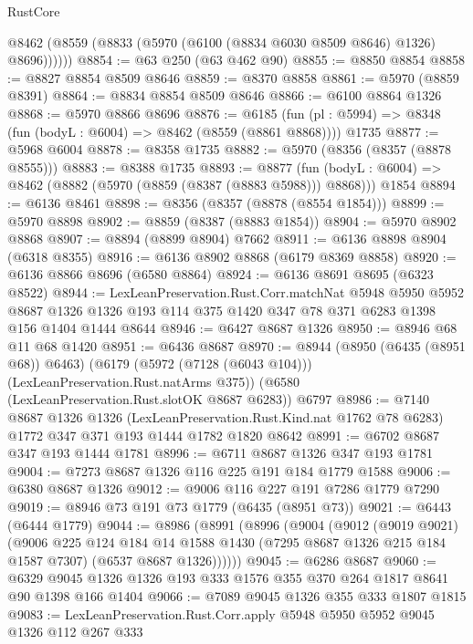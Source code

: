 \begin{lexlean}{RustCore}
\begin{coremodule}
{\begin{coremodule}
{{{{{{{{{{{{{{{{{{{{{{{{{{{{{{{{{{{{{{{{{{{{{        @8462 (@8559 (@8833 (@5970 (@6100 (@8834 @6030 @8509 @8646) @1326) @8696))))))
@8854 := @63 @250 (@63 @462 @90)
@8855 := @8850 @8854
@8858 := @8827 @8854 @8509 @8646
@8859 := @8370 @8858
@8861 := @5970 (@8859 @8391)
@8864 := @8834 @8854 @8509 @8646
@8866 := @6100 @8864 @1326
@8868 := @5970 @8866 @8696
@8876 := @6185
    (fun (pl : @5994) => @8348 (fun (bodyL : @6004) => @8462 (@8559 (@8861 @8868))))
    @1735
@8877 := @5968 @6004
@8878 := @8358 @1735
@8882 := @5970 (@8356 (@8357 (@8878 @8555)))
@8883 := @8388 @1735
@8893 := @8877
    (fun (bodyL : @6004) => @8462 (@8882 (@5970 (@8859 (@8387 (@8883 @5988))) @8868)))
    @1854
@8894 := @6136 @8461
@8898 := @8356 (@8357 (@8878 (@8554 @1854)))
@8899 := @5970 @8898
@8902 := @8859 (@8387 (@8883 @1854))
@8904 := @5970 @8902 @8868
@8907 := @8894 (@8899 @8904) @7662
@8911 := @6136 @8898 @8904 (@6318 @8355)
@8916 := @6136 @8902 @8868 (@6179 @8369 @8858)
@8920 := @6136 @8866 @8696 (@6580 @8864)
@8924 := @6136 @8691 @8695 (@6323 @8522)
@8944 := LexLeanPreservation.Rust.Corr.matchNat
    @5948
    @5950
    @5952
    @8687
    @1326
    @1326
    @193
    @114
    @375
    @1420
    @347
    @78
    @371
    @6283
    @1398
    @156
    @1404
    @1444
    @8644
@8946 := @6427 @8687 @1326
@8950 := @8946 @68 @11 @68 @1420
@8951 := @6436 @8687
@8970 := @8944
    (@8950 (@6435 (@8951 @68)) @6463)
    (@6179 (@5972 (@7128 (@6043 @104))) (LexLeanPreservation.Rust.natArms @375))
    (@6580 (LexLeanPreservation.Rust.slotOK @8687 @6283))
    @6797
@8986 := @7140
    @8687
    @1326
    @1326
    (LexLeanPreservation.Rust.Kind.nat @1762 @78 @6283)
    @1772
    @347
    @371
    @193
    @1444
    @1782
    @1820
    @8642
@8991 := @6702 @8687 @347 @193 @1444 @1781
@8996 := @6711 @8687 @1326 @347 @193 @1781
@9004 := @7273 @8687 @1326 @116 @225 @191 @184 @1779 @1588
@9006 := @6380 @8687 @1326
@9012 := @9006 @116 @227 @191 @7286 @1779 @7290
@9019 := @8946 @73 @191 @73 @1779 (@6435 (@8951 @73))
@9021 := @6443 (@6444 @1779)
@9044 := @8986
    (@8991
      (@8996
        (@9004
          (@9012
            (@9019 @9021)
            (@9006
              @225
              @124
              @184
              @14
              @1588
              @1430
              (@7295 @8687 @1326 @215 @184 @1587 @7307)
              (@6537 @8687 @1326))))))
@9045 := @6286 @8687
@9060 := @6329 @9045 @1326 @1326 @193 @333 @1576 @355 @370 @264 @1817 @8641 @90 @1398 @166 @1404
@9066 := @7089 @9045 @1326 @355 @333 @1807 @1815
@9083 := LexLeanPreservation.Rust.Corr.apply
    @5948
    @5950
    @5952
    @9045
    @1326
    @112
    @267
    @333
}}}}}}}}}}}}}}}}}}}}}}}}}}}}}}}}}}}}}}}}}}}}}
\end{coremodule}}
\end{coremodule}
\end{lexlean}
